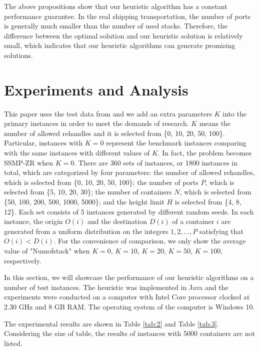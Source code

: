 \documentclass[review,3p,times,authoryear,12pt]{elsarticle}
\begin{document}
The above propositions show that our heuristic algorithm has a constant performance guarantee.
In the real shipping transportation, the number of ports is generally much smaller than the number of used stacks.
Therefore, the difference between the optimal solution and our heuristic solution is relatively small, which indicates that our heuristic algorithms can generate promising solutions.


\section{Experiments and Analysis}
\label{sec:ea}

This paper uses the test data from \cite{wang2014stowage} and we add an extra parameters $K$ into the primary instances in order to meet the demands of research.
$K$ means the number of allowed rehandles and it is selected from \{0, 10, 20, 50, 100\}.
Particular, instances with $K=0$ represent the benchmark instances comparing with the same instances with different values of $K$.
In fact, the problem becomes SSMP-ZR when $K=0$.
There are 360 sets of instances, or 1800 instances in total, which are categorized by four parameters: the number of allowed rehandles, which is selected from \{0, 10, 20, 50, 100\};
the number of ports $P$, which is selected from \{5, 10, 20, 30\};
the number of containers $N$, which is selected from \{50, 100, 200, 500, 1000, 5000\};
and the height limit $H$ is selected from \{4, 8, 12\}.
Each set consists of 5 instances generated by different random seeds.
In each instance, the origin $O(i)$ and the destination $D(i)$ of a container $i$ are generated from a uniform distribution on the integers $1, 2, \ldots, P$ satisfying that $O(i)<D(i)$.
For the convenience of comparison, we only show the average value of "Numofstack" when $K=0$, $K=10$, $K=20$, $K=50$, $K=100$, respectively.

In this section, we will showcase the performance of our heuristic algorithms on a number of test instances.
The heuristic was implemented in Java and the experiments were conducted on a computer with Intel Core processor clocked at 2.30 GHz and 8 GB RAM.
The operating system of the computer is Windows 10.

The experimental results are shown in Table \ref{tab:2} and Table \ref{tab:3}.
Considering the size of table, the results of instances with 5000 containers are not listed.
\end{document}
